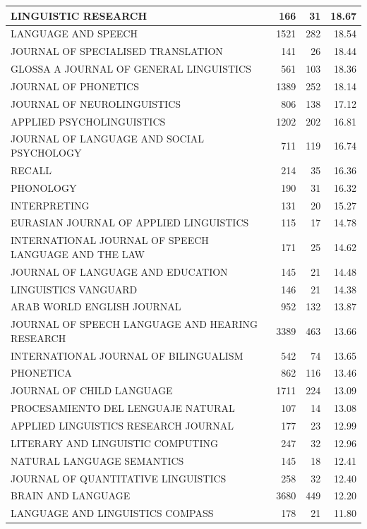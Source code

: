 \documentclass[]{elsarticle} %
\begin{document}
\begin{table}
\begin{tabular}[t]{l|r|r|r}
\hline
LINGUISTIC RESEARCH & 166 & 31 & 18.67\\
\hline
LANGUAGE AND SPEECH & 1521 & 282 & 18.54\\
\hline
JOURNAL OF SPECIALISED TRANSLATION & 141 & 26 & 18.44\\
\hline
GLOSSA A JOURNAL OF GENERAL LINGUISTICS & 561 & 103 & 18.36\\
\hline
JOURNAL OF PHONETICS & 1389 & 252 & 18.14\\
\hline
JOURNAL OF NEUROLINGUISTICS & 806 & 138 & 17.12\\
\hline
APPLIED PSYCHOLINGUISTICS & 1202 & 202 & 16.81\\
\hline
JOURNAL OF LANGUAGE AND SOCIAL PSYCHOLOGY & 711 & 119 & 16.74\\
\hline
RECALL & 214 & 35 & 16.36\\
\hline
PHONOLOGY & 190 & 31 & 16.32\\
\hline
INTERPRETING & 131 & 20 & 15.27\\
\hline
EURASIAN JOURNAL OF APPLIED LINGUISTICS & 115 & 17 & 14.78\\
\hline
INTERNATIONAL JOURNAL OF SPEECH LANGUAGE AND THE LAW & 171 & 25 & 14.62\\
\hline
JOURNAL OF LANGUAGE AND EDUCATION & 145 & 21 & 14.48\\
\hline
LINGUISTICS VANGUARD & 146 & 21 & 14.38\\
\hline
ARAB WORLD ENGLISH JOURNAL & 952 & 132 & 13.87\\
\hline
JOURNAL OF SPEECH LANGUAGE AND HEARING RESEARCH & 3389 & 463 & 13.66\\
\hline
INTERNATIONAL JOURNAL OF BILINGUALISM & 542 & 74 & 13.65\\
\hline
PHONETICA & 862 & 116 & 13.46\\
\hline
JOURNAL OF CHILD LANGUAGE & 1711 & 224 & 13.09\\
\hline
PROCESAMIENTO DEL LENGUAJE NATURAL & 107 & 14 & 13.08\\
\hline
APPLIED LINGUISTICS RESEARCH JOURNAL & 177 & 23 & 12.99\\
\hline
LITERARY AND LINGUISTIC COMPUTING & 247 & 32 & 12.96\\
\hline
NATURAL LANGUAGE SEMANTICS & 145 & 18 & 12.41\\
\hline
JOURNAL OF QUANTITATIVE LINGUISTICS & 258 & 32 & 12.40\\
\hline
BRAIN AND LANGUAGE & 3680 & 449 & 12.20\\
\hline
LANGUAGE AND LINGUISTICS COMPASS & 178 & 21 & 11.80\\

\end{tabular}
\end{table}
\end{document}

